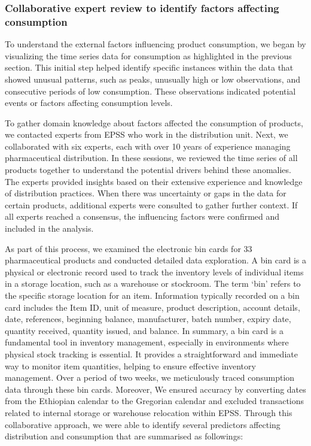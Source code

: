 \documentclass[
  authoryear,
  preprint,
  3p]{elsarticle}
\begin{document}
\subsubsection{Collaborative expert review to identify factors affecting
consumption}\label{collaborative-expert-review-to-identify-factors-affecting-consumption}

To understand the external factors influencing product consumption, we
began by visualizing the time series data for consumption as highlighted
in the previous section. This initial step helped identify specific
instances within the data that showed unusual patterns, such as peaks,
unusually high or low observations, and consecutive periods of low
consumption. These observations indicated potential events or factors
affecting consumption levels.

To gather domain knowledge about factors affected the consumption of
products, we contacted experts from EPSS who work in the distribution
unit. Next, we collaborated with six experts, each with over 10 years of
experience managing pharmaceutical distribution. In these sessions, we
reviewed the time series of all products together to understand the
potential drivers behind these anomalies. The experts provided insights
based on their extensive experience and knowledge of distribution
practices. When there was uncertainty or gaps in the data for certain
products, additional experts were consulted to gather further context.
If all experts reached a consensus, the influencing factors were
confirmed and included in the analysis.

As part of this process, we examined the electronic bin cards for 33
pharmaceutical products and conducted detailed data exploration. A bin
card is a physical or electronic record used to track the inventory
levels of individual items in a storage location, such as a warehouse or
stockroom. The term `bin' refers to the specific storage location for an
item. Information typically recorded on a bin card includes the Item ID,
unit of measure, product description, account details, date, references,
beginning balance, manufacturer, batch number, expiry date, quantity
received, quantity issued, and balance. In summary, a bin card is a
fundamental tool in inventory management, especially in environments
where physical stock tracking is essential. It provides a
straightforward and immediate way to monitor item quantities, helping to
ensure effective inventory management. Over a period of two weeks, we
meticulously traced consumption data through these bin cards. Moreover,
We ensured accuracy by converting dates from the Ethiopian calendar to
the Gregorian calendar and excluded transactions related to internal
storage or warehouse relocation within EPSS. Through this collaborative
approach, we were able to identify several predictors affecting
distribution and consumption that are summarised as followings:
\end{document}
